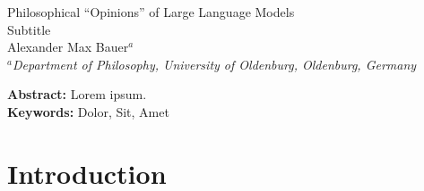 \documentclass[egregdoesnotlikesansseriftitles]{scrartcl}
\begin{document}
\thispagestyle{empty}
\renewcommand{\thefootnote}{\fnsymbol{footnote}}
\begin{center}
   {\LARGE Philosophical \enquote{Opinions} of Large Language Models}\\\vspace{2ex}
   {\Large Subtitle}\\\vspace{4ex}
   {\large Alexander Max Bauer$^{a}$\footnotemark[1]}\\\vspace{2ex}
   \textsl{\footnotesize $^{a}$Department of Philosophy, University of Oldenburg, Oldenburg, Germany}\\\vspace{2ex}
\end{center}

\vspace{\fill}\noindent\textbf{Abstract:} Lorem ipsum.\\[0.5ex]

\noindent\textbf{Keywords:} Dolor, Sit, Amet


\renewcommand{\thefootnote}{\arabic{footnote}}\setcounter{footnote}{0}
\newpage


\section{Introduction}\label{sec:introduction}
\citealt{barua_psychology_nd}
\end{document}
